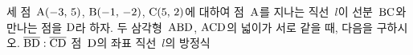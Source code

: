 세 점~$\mathrm{A}(-3,\,5)$, $\mathrm{B}(-1,\,-2)$, $\mathrm{C}(5,\,2)$에 대하여 점~$\mathrm{A}$를 지나는 직선~$l$이 선분~$\mathrm{BC}$와 만나는 점을 $\mathrm{D}$라 하자. 두 삼각형~$\mathrm{ABD}$, $\mathrm{ACD}$의 넓이가 서로 같을 때, 다음을 구하시오.
 $\overline{\mathrm{BD}}:\overline{\mathrm{CD}}$
 점~$\mathrm{D}$의 좌표
 직선~$l$의 방정식

